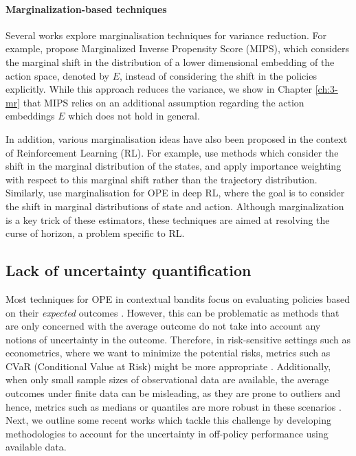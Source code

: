 \paragraph{Marginalization-based techniques}
Several works explore marginalisation techniques for variance reduction. For example, \cite{saito2022off} propose Marginalized Inverse Propensity Score (MIPS), which considers the marginal shift in the distribution of a lower dimensional embedding of the action space, denoted by $E$, instead of considering the shift in the policies explicitly. 
While this approach reduces the variance, we show in Chapter \ref{ch:3-mr} that MIPS relies on an additional assumption regarding the action embeddings $E$ which does not hold in general.

In addition, various marginalisation ideas have also been proposed in the context of Reinforcement Learning (RL). For example, \cite{liu2018breaking, xie2019advances, kallus2020off} use methods which consider the shift in the marginal distribution of the states, and apply importance weighting with respect to this marginal shift rather than the trajectory distribution. Similarly, \cite{Fujimoto2021deep} use marginalisation for OPE in deep RL, where the goal is to consider the shift in marginal distributions of state and action. Although marginalization is a key trick of these estimators, these techniques are aimed at resolving the curse of horizon, a problem specific to RL.



\subsection{Lack of uncertainty quantification}\label{subsec:uncertainty-quantification}
Most techniques for OPE in contextual bandits focus on evaluating policies based on their \emph{expected} outcomes \citep{uncertainty5, adaptive-ope, uncertainty2, uncertainty3, uncertainty4, doubly-robust}. However, this can be problematic as
methods that are only concerned with the average outcome do not take into account any notions of
uncertainty in the outcome. Therefore, in risk-sensitive settings such as econometrics, where we want
to minimize the potential risks, metrics such as CVaR (Conditional Value at Risk) might be more
appropriate \citep{keramati2020being}. Additionally, when only small sample sizes of observational data are available, the average outcomes under finite data can be misleading, as they are prone to outliers and hence, metrics such as medians or quantiles are more robust in these scenarios \citep{altschuler2019best}. Next, we outline some recent works which tackle this challenge by developing methodologies to account for the uncertainty in off-policy performance using available data. 

